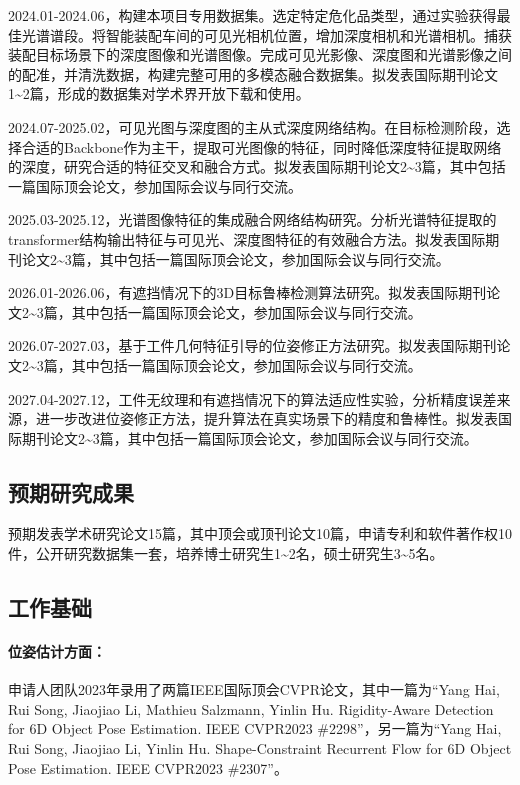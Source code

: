 \documentclass[12pt]{article}
\newcommand{\myPara}[1]{\paragraph{#1：}}
\begin{document}
2024.01-2024.06，构建本项目专用数据集。选定特定危化品类型，通过实验获得最佳光谱谱段。将智能装配车间的可见光相机位置，增加深度相机和光谱相机。捕获装配目标场景下的深度图像和光谱图像。完成可见光影像、深度图和光谱影像之间的配准，并清洗数据，构建完整可用的多模态融合数据集。拟发表国际期刊论文1\textasciitilde2篇，形成的数据集对学术界开放下载和使用。

2024.07-2025.02，可见光图与深度图的主从式深度网络结构。在目标检测阶段，选择合适的Backbone作为主干，提取可光图像的特征，同时降低深度特征提取网络的深度，研究合适的特征交叉和融合方式。拟发表国际期刊论文2\textasciitilde3篇，其中包括一篇国际顶会论文，参加国际会议与同行交流。

2025.03-2025.12，光谱图像特征的集成融合网络结构研究。分析光谱特征提取的transformer结构输出特征与可见光、深度图特征的有效融合方法。拟发表国际期刊论文2\textasciitilde3篇，其中包括一篇国际顶会论文，参加国际会议与同行交流。

2026.01-2026.06，有遮挡情况下的3D目标鲁棒检测算法研究。拟发表国际期刊论文2\textasciitilde3篇，其中包括一篇国际顶会论文，参加国际会议与同行交流。

2026.07-2027.03，基于工件几何特征引导的位姿修正方法研究。拟发表国际期刊论文2\textasciitilde3篇，其中包括一篇国际顶会论文，参加国际会议与同行交流。

2027.04-2027.12，工件无纹理和有遮挡情况下的算法适应性实验，分析精度误差来源，进一步改进位姿修正方法，提升算法在真实场景下的精度和鲁棒性。拟发表国际期刊论文2\textasciitilde3篇，其中包括一篇国际顶会论文，参加国际会议与同行交流。

\subsection{预期研究成果}

预期发表学术研究论文15篇，其中顶会或顶刊论文10篇，申请专利和软件著作权10件，公开研究数据集一套，培养博士研究生1\textasciitilde2名，硕士研究生3\textasciitilde5名。




\subsection{工作基础}


\myPara{位姿估计方面}申请人团队2023年录用了两篇IEEE国际顶会CVPR论文，其中一篇为“Yang Hai, Rui Song, Jiaojiao Li, Mathieu Salzmann, Yinlin Hu. Rigidity-Aware Detection for 6D Object Pose Estimation. IEEE CVPR2023 \#2298”，另一篇为“Yang Hai, Rui Song, Jiaojiao Li, Yinlin Hu. Shape-Constraint Recurrent Flow for 6D Object Pose Estimation. IEEE CVPR2023 \#2307”。
\end{document}
